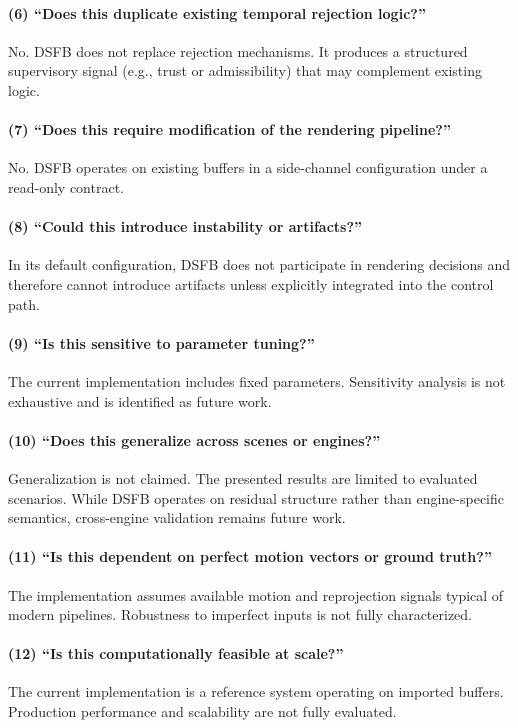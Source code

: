 \documentclass[11pt,letterpaper]{article}
\theoremstyle{gcresult}
\theoremstyle{definition}
\begin{document}
\paragraph{(6) ``Does this duplicate existing temporal rejection logic?''}
No. DSFB does not replace rejection mechanisms. It produces a structured supervisory signal (e.g., trust or admissibility) that may complement existing logic.

\paragraph{(7) ``Does this require modification of the rendering pipeline?''}
No. DSFB operates on existing buffers in a side-channel configuration under a read-only contract.

\paragraph{(8) ``Could this introduce instability or artifacts?''}
In its default configuration, DSFB does not participate in rendering decisions and therefore cannot introduce artifacts unless explicitly integrated into the control path.

\paragraph{(9) ``Is this sensitive to parameter tuning?''}
The current implementation includes fixed parameters. Sensitivity analysis is not exhaustive and is identified as future work.

\paragraph{(10) ``Does this generalize across scenes or engines?''}
Generalization is not claimed. The presented results are limited to evaluated scenarios. While DSFB operates on residual structure rather than engine-specific semantics, cross-engine validation remains future work.

\paragraph{(11) ``Is this dependent on perfect motion vectors or ground truth?''}
The implementation assumes available motion and reprojection signals typical of modern pipelines. Robustness to imperfect inputs is not fully characterized.

\paragraph{(12) ``Is this computationally feasible at scale?''}
The current implementation is a reference system operating on imported buffers. Production performance and scalability are not fully evaluated.
\end{document}
